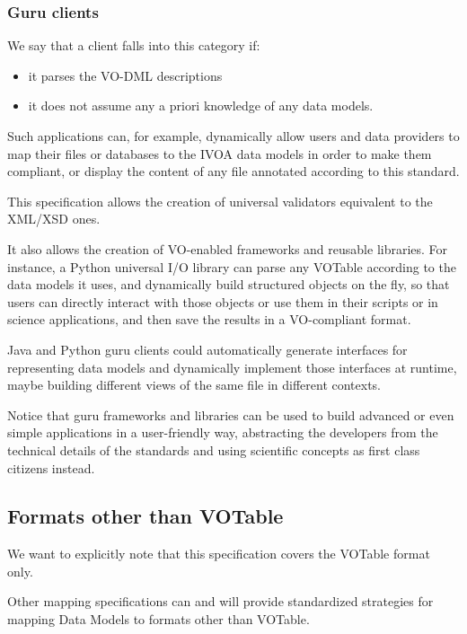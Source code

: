 \documentclass[11pt,a4paper]{ivoa}
\begin{document}
\subsubsection{Guru clients}\label{guru-clients}

We say that a client falls into this category if:

\begin{itemize}
\item
  it parses the VO-DML descriptions
\item
  it does not assume any a priori knowledge of any data models.
\end{itemize}

Such applications can, for example, dynamically allow users and data
providers to map their files or databases to the IVOA data models in
order to make them compliant, or display the content of any file
annotated according to this standard.

This specification allows the creation of universal validators
equivalent to the XML/XSD ones.

It also allows the creation of VO-enabled frameworks and reusable
libraries. For instance, a Python universal I/O library can parse any
VOTable according to the data models it uses, and dynamically build
structured objects on the fly, so that users can directly interact with
those objects or use them in their scripts or in science applications,
and then save the results in a VO-compliant format.

Java and Python guru clients could automatically generate interfaces for
representing data models and dynamically implement those interfaces at
runtime, maybe building different views of the same file in different
contexts.

Notice that guru frameworks and libraries can be used to build advanced
or even simple applications in a user-friendly way, abstracting the
developers from the technical details of the standards and using
scientific concepts as first class citizens instead.

\subsection{Formats other than VOTable}\label{sec:other-formats}

We want to explicitly note that this specification covers the VOTable
format only.

Other mapping specifications can and will provide standardized
strategies for mapping Data Models to formats other than VOTable.
\end{document}
